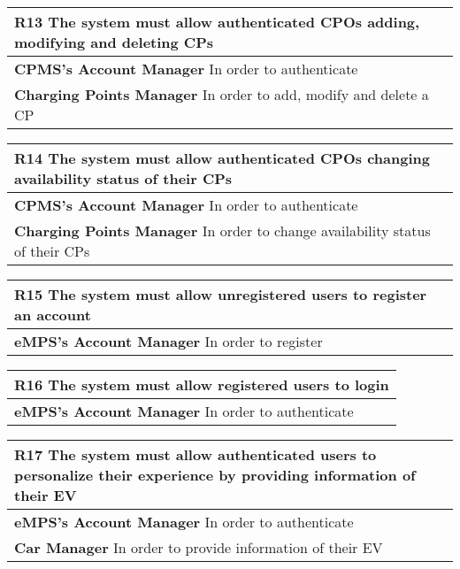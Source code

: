 \begin{table}[H]
    \begin{tabularx}{\textwidth}{X}
        \toprule
        \textbf{R13} The system must allow authenticated CPOs adding, modifying and deleting CPs \\ \midrule
        \textbf{CPMS's Account Manager}  In order to authenticate                                \\
        \textbf{Charging Points Manager}  In order to add, modify and delete a CP                \\
    \end{tabularx}
\end{table}
\begin{table}[H]
    \begin{tabularx}{\textwidth}{X}
        \toprule
        \textbf{R14} The system must allow authenticated CPOs changing availability status of
        their CPs                                                                            \\ \midrule
        \textbf{CPMS's Account Manager} In order to authenticate                             \\
        \textbf{Charging Points Manager} In order to change availability status of their CPs \\
    \end{tabularx}
\end{table}
\begin{table}[H]
    \begin{tabularx}{\textwidth}{X}
        \toprule
        \textbf{R15} The system must allow unregistered users to register an account \\ \midrule
        \textbf{eMPS's Account Manager} In order to register                         \\
    \end{tabularx}
\end{table}
\begin{table}[H]
    \begin{tabularx}{\textwidth}{X}
        \toprule
        \textbf{R16} The system must allow registered users to login \\ \midrule
        \textbf{eMPS's Account Manager} In order to authenticate     \\
    \end{tabularx}
\end{table}
\begin{table}[H]
    \begin{tabularx}{\textwidth}{X}
        \toprule
        \textbf{R17} The system must allow authenticated users to personalize their experience by
        providing information of their EV                                \\ \midrule
        \textbf{eMPS's Account Manager} In order to authenticate         \\
        \textbf{Car Manager} In order to provide information of their EV \\
    \end{tabularx}
\end{table}

